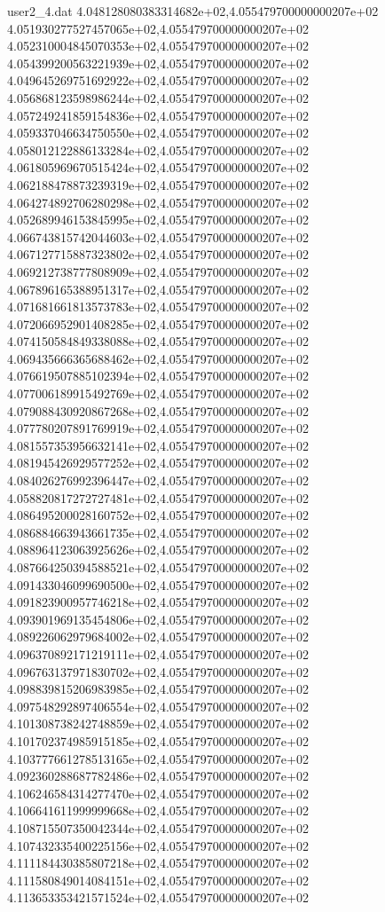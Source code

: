 \begin{filecontents}{user2_4.dat}
4.048128080383314682e+02,4.055479700000000207e+02
4.051930277527457065e+02,4.055479700000000207e+02
4.052310004845070353e+02,4.055479700000000207e+02
4.054399200563221939e+02,4.055479700000000207e+02
4.049645269751692922e+02,4.055479700000000207e+02
4.056868123598986244e+02,4.055479700000000207e+02
4.057249241859154836e+02,4.055479700000000207e+02
4.059337046634750550e+02,4.055479700000000207e+02
4.058012122886133284e+02,4.055479700000000207e+02
4.061805969670515424e+02,4.055479700000000207e+02
4.062188478873239319e+02,4.055479700000000207e+02
4.064274892706280298e+02,4.055479700000000207e+02
4.052689946153845995e+02,4.055479700000000207e+02
4.066743815742044603e+02,4.055479700000000207e+02
4.067127715887323802e+02,4.055479700000000207e+02
4.069212738777808909e+02,4.055479700000000207e+02
4.067896165388951317e+02,4.055479700000000207e+02
4.071681661813573783e+02,4.055479700000000207e+02
4.072066952901408285e+02,4.055479700000000207e+02
4.074150584849338088e+02,4.055479700000000207e+02
4.069435666365688462e+02,4.055479700000000207e+02
4.076619507885102394e+02,4.055479700000000207e+02
4.077006189915492769e+02,4.055479700000000207e+02
4.079088430920867268e+02,4.055479700000000207e+02
4.077780207891769919e+02,4.055479700000000207e+02
4.081557353956632141e+02,4.055479700000000207e+02
4.081945426929577252e+02,4.055479700000000207e+02
4.084026276992396447e+02,4.055479700000000207e+02
4.058820817272727481e+02,4.055479700000000207e+02
4.086495200028160752e+02,4.055479700000000207e+02
4.086884663943661735e+02,4.055479700000000207e+02
4.088964123063925626e+02,4.055479700000000207e+02
4.087664250394588521e+02,4.055479700000000207e+02
4.091433046099690500e+02,4.055479700000000207e+02
4.091823900957746218e+02,4.055479700000000207e+02
4.093901969135454806e+02,4.055479700000000207e+02
4.089226062979684002e+02,4.055479700000000207e+02
4.096370892171219111e+02,4.055479700000000207e+02
4.096763137971830702e+02,4.055479700000000207e+02
4.098839815206983985e+02,4.055479700000000207e+02
4.097548292897406554e+02,4.055479700000000207e+02
4.101308738242748859e+02,4.055479700000000207e+02
4.101702374985915185e+02,4.055479700000000207e+02
4.103777661278513165e+02,4.055479700000000207e+02
4.092360288687782486e+02,4.055479700000000207e+02
4.106246584314277470e+02,4.055479700000000207e+02
4.106641611999999668e+02,4.055479700000000207e+02
4.108715507350042344e+02,4.055479700000000207e+02
4.107432335400225156e+02,4.055479700000000207e+02
4.111184430385807218e+02,4.055479700000000207e+02
4.111580849014084151e+02,4.055479700000000207e+02
4.113653353421571524e+02,4.055479700000000207e+02

\end{filecontents}

